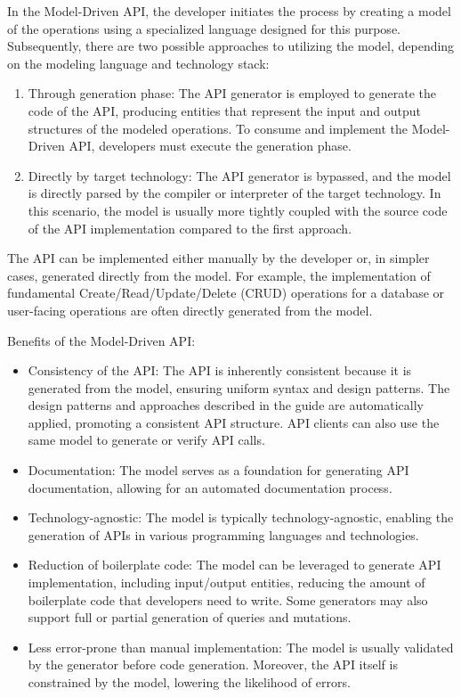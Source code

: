 In the Model-Driven API, the developer initiates the process by creating a model of the operations using
a specialized language designed for this purpose.
Subsequently, there are two possible approaches to utilizing the model,
depending on the modeling language and technology stack:

\begin{enumerate}
    \item Through generation phase:
    The API generator is employed to generate the code of the API, producing entities that represent
    the input and output structures of the modeled operations.
    To consume and implement the Model-Driven API, developers must execute the generation phase.
    \item Directly by target technology:
    The API generator is bypassed, and the model is directly parsed by the compiler or interpreter
    of the target technology.
    In this scenario, the model is usually more tightly coupled with the source code of the API implementation
    compared to the first approach.
\end{enumerate}

The API can be implemented either manually by the developer or, in simpler cases, generated directly from the model.
For example, the implementation of fundamental Create/Read/Update/Delete (CRUD) operations for a database
or user-facing operations are often directly generated from the model.

Benefits of the Model-Driven API:

\begin{itemize}
    \item Consistency of the API:
    The API is inherently consistent because it is generated from the model, ensuring uniform syntax
    and design patterns.
    The design patterns and approaches described in the guide are automatically applied,
    promoting a consistent API structure.
    API clients can also use the same model to generate or verify API calls.
    \item Documentation:
    The model serves as a foundation for generating API documentation, allowing for an automated documentation process.
    \item Technology-agnostic:
    The model is typically technology-agnostic, enabling the generation of APIs
    in various programming languages and technologies.
    \item Reduction of boilerplate code:
    The model can be leveraged to generate API implementation, including input/output entities,
    reducing the amount of boilerplate code that developers need to write.
    Some generators may also support full or partial generation of queries and mutations.
    \item Less error-prone than manual implementation:
    The model is usually validated by the generator before code generation.
    Moreover, the API itself is constrained by the model, lowering the likelihood of errors.
\end{itemize}

